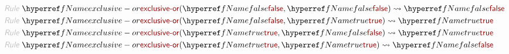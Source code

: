 \begin{align*}
  \KEY{Rule} ~ 
    & \NAMEREF{exclusive-or}
        ( \NAMEREF{false},   
          \NAMEREF{false} ) \leadsto
        \NAMEREF{false}
\\
  \KEY{Rule} ~ 
    & \NAMEREF{exclusive-or}
        ( \NAMEREF{false},   
          \NAMEREF{true} ) \leadsto
        \NAMEREF{true}
\\
  \KEY{Rule} ~ 
    & \NAMEREF{exclusive-or}
        ( \NAMEREF{true},   
          \NAMEREF{false} ) \leadsto
        \NAMEREF{true}
\\
  \KEY{Rule} ~ 
    & \NAMEREF{exclusive-or}
        ( \NAMEREF{true},   
          \NAMEREF{true} ) \leadsto
        \NAMEREF{false}
\end{align*}
